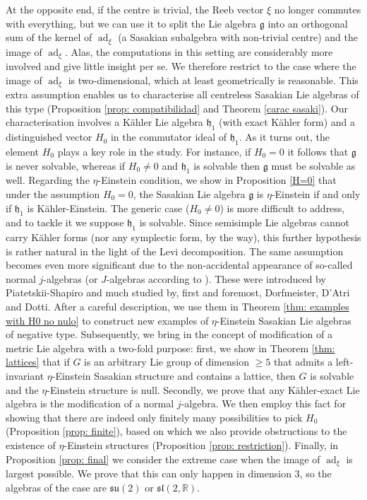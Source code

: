 \documentclass[12pt, twoside]{amsart}
\def\g{\mathfrak{g}}
\def\h{\mathfrak{h}}
\def\R{\mathbb{R}}
\def\ad{\operatorname{ad}}
\renewcommand{\geq}{\geqslant}\renewcommand{\leq}{\leqslant}
\theoremstyle{definition}
\begin{document}
\quad At the opposite end, if the centre is trivial, the Reeb vector $\xi$ no longer commutes with everything, but we can use it to split the Lie algebra $\g$ into an  orthogonal sum of the kernel of $\ad_\xi$ (a Sasakian subalgebra with non-trivial centre) and the image of $\ad_\xi$. Alas, the computations in this setting are considerably more involved and give little insight per se. We therefore restrict to the case where the image of $\ad_\xi$ is two-dimensional, which at least geometrically is reasonable. This extra assumption enables us to characterise all centreless Sasakian Lie algebras of this type (Proposition \ref{prop: compatibilidad} and Theorem \ref{carac sasaki}). Our characterisation involves a K{\"a}hler Lie algebra $\h_1$ (with exact K{\"a}hler form) and a distinguished vector $H_0$ in the commutator ideal of $\h_1$. As it turns out, the element $H_0$ plays a key  role in the study. For instance, if $H_0=0$ it follows that $\g$ is never solvable, whereas if $H_0\neq 0$ and $\h_1$ is solvable then $\g$ must be solvable as well. 
Regarding the $\eta$-Einstein condition, we show in Proposition \ref{H=0} that under the assumption $H_0=0$, the Sasakian Lie algebra $\g$ is $\eta$-Einstein if and only if $\h_1$ is K{\"a}hler-Einstein. The generic case ($H_0\neq 0$) is more difficult to address, and to tackle it we suppose $\h_1$ is solvable. 
Since semisimple Lie algebras cannot carry K{\"a}hler forms (nor any symplectic form, by the way), this further hypothesis is rather natural in the light of the Levi decomposition. The same assumption becomes even more significant due to the non-accidental appearance of so-called normal $j$-algebras (or $J$-algebras according to \cite{Dalek-Keizo-Kamishima}). These were introduced by Piatetskii-Shapiro and much studied by, first and foremost, Dorfmeister, D'Atri and Dotti. After a careful description, we use them in Theorem \ref{thm: examples with H0 no nulo} to construct new examples of $\eta$-Einstein Sasakian Lie algebras of negative type. 
\smallbreak 
Subsequently, we bring in the concept of modification of a metric Lie algebra with a two-fold purpose: first, we show in Theorem \ref{thm: lattices} that if $G$ is an arbitrary Lie group of dimension $\geq 5$ that admits a left-invariant $\eta$-Einstein Sasakian structure and contains a lattice, then $G$ is solvable and the $\eta$-Einstein structure is null. Secondly, we prove that any K{\"a}hler-exact Lie algebra is the modification of a normal $j$-algebra. We then employ this fact for showing that there are indeed only finitely many possibilities to pick $H_0$ 
(Proposition \ref{prop: finite}), based on which we also provide obstructions to the existence of $\eta$-Einstein structures (Proposition \ref{prop: restriction}).  
\smallbreak 
 Finally, in Proposition \ref{prop: final} we consider the extreme case when the image of $\ad_{\xi}$ is largest possible. We prove that this can only happen in dimension $3$, so the algebras of the case are $\mathfrak{su}(2)$ or $\mathfrak{sl}(2,\R)$.
\end{document}
